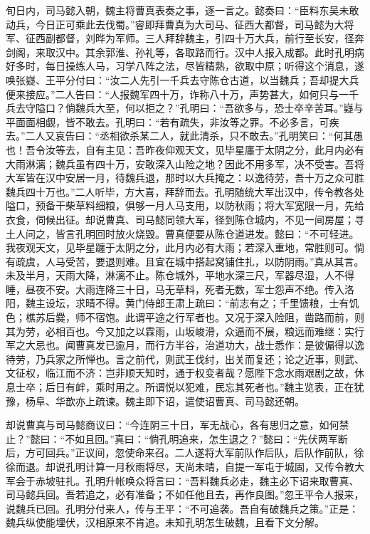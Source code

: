 旬日内，司马懿入朝，魏主将曹真表奏之事，逐一言之。懿奏曰：“臣料东吴未敢动兵，今日正可乘此去伐蜀。”睿即拜曹真为大司马、征西大都督，司马懿为大将军、征西副都督，刘晔为军师。三人拜辞魏主，引四十万大兵，前行至长安，径奔剑阁，来取汉中。其余郭淮、孙礼等，各取路而行。汉中人报入成都。此时孔明病好多时，每日操练人马，习学八阵之法，尽皆精熟，欲取中原；听得这个消息，遂唤张嶷、王平分付曰：“汝二人先引一千兵去守陈仓古道，以当魏兵；吾却提大兵便来接应。”二人告曰：“人报魏军四十万，诈称八十万，声势甚大，如何只与一千兵去守隘口？倘魏兵大至，何以拒之？”孔明曰：“吾欲多与，恐士卒辛苦耳。”嶷与平面面相觑，皆不敢去。孔明曰：“若有疏失，非汝等之罪。不必多言，可疾去。”二人又哀告曰：“丞相欲杀某二人，就此清杀，只不敢去。”孔明笑曰：“何其愚也！吾令汝等去，自有主见：吾昨夜仰观天文，见毕星廛于太阴之分，此月内必有大雨淋漓；魏兵虽有四十万，安敢深入山险之地？因此不用多军，决不受害。吾将大军皆在汉中安居一月，待魏兵退，那时以大兵掩之：以逸待劳，吾十万之众可胜魏兵四十万也。”二人听毕，方大喜，拜辞而去。孔明随统大军出汉中，传令教各处隘口，预备干柴草料细粮，俱够一月人马支用，以防秋雨；将大军宽限一月，先给衣食，伺候出征。却说曹真、司马懿同领大军，径到陈仓城内，不见一间房屋；寻土人问之，皆言孔明回时放火烧毁。曹真便要从陈仓道进发。懿曰：“不可轻进。我夜观天文，见毕星躔于太阴之分，此月内必有大雨；若深入重地，常胜则可。倘有疏虞，人马受苦，要退则难。且宜在城中搭起窝铺住扎，以防阴雨。”真从其言。未及半月，天雨大降，淋漓不止。陈仓城外，平地水深三尺，军器尽湿，人不得睡，昼夜不安。大雨连降三十日，马无草料，死者无数，军士怨声不绝。传入洛阳，魏主设坛，求晴不得。黄门侍郎王肃上疏曰：“前志有之；千里馈粮，士有饥色；樵苏后爨，师不宿饱。此谓平途之行军者也。又况于深入险阻，凿路而前，则其为劳，必相百也。今又加之以霖雨，山坂峻滑，众逼而不展，粮远而难继：实行军之大忌也。闻曹真发已逾月，而行方半谷，治道功大，战士悉作：是彼偏得以逸待劳，乃兵家之所惮也。言之前代，则武王伐纣，出关而复还；论之近事，则武、文征权，临江而不济：岂非顺天知时，通于权变者哉？愿陛下念水雨艰剧之故，休息士卒；后日有衅，乘时用之。所谓悦以犯难，民忘其死者也。”魏主览表，正在犹豫，杨阜、华歆亦上疏谏。魏主即下诏，遣使诏曹真、司马懿还朝。

却说曹真与司马懿商议曰：“今连阴三十日，军无战心，各有思归之意，如何禁止？”懿曰：“不如且回。”真曰：“倘孔明追来，怎生退之？”懿曰：“先伏两军断后，方可回兵。”正议间，忽使命来召。二人遂将大军前队作后队，后队作前队，徐徐而退。却说孔明计算一月秋雨将尽，天尚未晴，自提一军屯于城固，又传令教大军会于赤坡驻扎。孔明升帐唤众将言曰：“吾料魏兵必走，魏主必下诏来取曹真、司马懿兵回。吾若追之，必有准备；不如任他且去，再作良图。”忽王平令人报来，说魏兵已回。孔明分付来人，传与王平：“不可追袭。吾自有破魏兵之策。”正是：魏兵纵使能埋伏，汉相原来不肯追。未知孔明怎生破魏，且看下文分解。